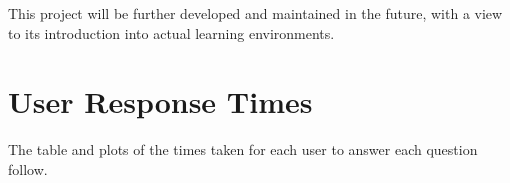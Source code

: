 \documentclass[12pt,twoside,notitlepage,xetex]{report}
\begin{document}
This project will be further developed and maintained in the future, with a view to its introduction into actual learning environments.




\cleardoublepage



\cleardoublepage

\appendix

\chapter{User Response Times}

The table and plots of the times taken for each user to answer each question follow.
\end{document}
